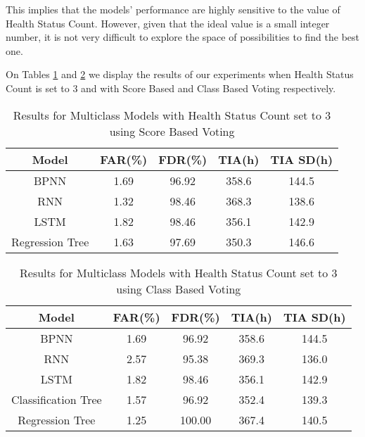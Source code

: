 This implies that the models' performance are highly sensitive to the value of Health Status Count.
However, given that the ideal value is a small integer number, it is not very difficult to explore the space of possibilities to find the best one.


On Tables \ref{table:results_multiclass_three_health_status_score_voting} and \ref{table:results_multiclass_three_health_status_class_voting} we display the results of our experiments when Health Status Count is set to 3 and with Score Based and Class Based Voting respectively.

\begin{table}
  \begin{center}
    \begin{tabular}{|c|c|c|c|c|}
      \hline
    Model & FAR(\%) & FDR(\%) & TIA(h) & TIA SD(h) \\
    \hline
    BPNN & 1.69 & 96.92 & 358.6 & 144.5 \\
    RNN & 1.32 & 98.46 & 368.3 & 138.6 \\ 
    LSTM & 1.82 & 98.46 & 356.1 & 142.9\\
    Regression Tree & 1.63 & 97.69 & 350.3 & 146.6 \\
    \hline
    \end{tabular}
    \caption[Results Multiclass Models with Health Status Count set to 3, Score Voting]{Results for Multiclass Models with Health Status Count set to 3 using Score Based Voting}
    \label{table:results_multiclass_three_health_status_score_voting}
  \end{center}
\end{table}

\begin{table}
  \begin{center}
    \begin{tabular}{|c|c|c|c|c|}
      \hline
    Model & FAR(\%) & FDR(\%) & TIA(h) & TIA SD(h) \\
    \hline
    BPNN & 1.69 & 96.92 & 358.6 & 144.5 \\
    RNN & 2.57 & 95.38 & 369.3 & 136.0 \\ 
    LSTM & 1.82 & 98.46 & 356.1 & 142.9\\
    Classification Tree & 1.57 & 96.92 & 352.4 & 139.3 \\
    Regression Tree & 1.25 & 100.00 & 367.4 & 140.5 \\
    \hline
    \end{tabular}
    \caption[Results Multiclass Models with Health Status Count set to 3, Class Voting]{Results for Multiclass Models with Health Status Count set to 3 using Class Based Voting}
    \label{table:results_multiclass_three_health_status_class_voting}
  \end{center}
\end{table}

